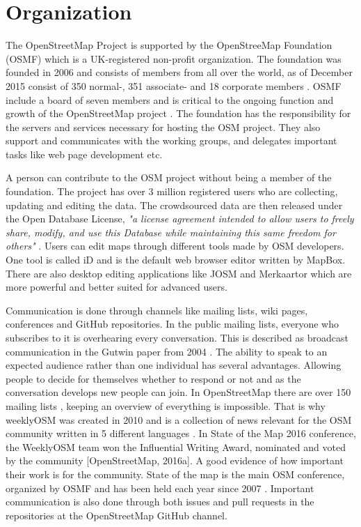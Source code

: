 \section{Organization}
The OpenStreetMap Project is supported by the OpenStreeMap Foundation (OSMF) which is a UK-registered non-profit organization. The foundation was founded in 2006 and consists of members from all over the world, as of December 2015 consist of 350 normal-, 351 associate- and 18 corporate members \cite{OSMF2015}. OSMF include a board of seven members and is critical to the ongoing function and growth of the OpenStreetMap project \cite{OSMF}.  The foundation has the responsibility for the servers and services necessary for hosting the OSM project. They also support and communicates with the working groups, and delegates important tasks like web page development etc. 

A person can contribute to the OSM project without being a member of the foundation. The project has over 3 million registered users \cite{OSMProject2016} who are collecting, updating and editing the data. The crowdsourced data are then released under the Open Database License, \textit{"a license agreement intended to allow users to freely share, modify, and use this Database while maintaining this same freedom for others"} \cite{ODbL}.  Users can edit maps through different tools made by OSM developers. One tool is called iD and is the default web browser editor written by MapBox. There are also desktop editing applications like JOSM and Merkaartor which are more powerful and better suited for advanced users. 

Communication is done through channels like mailing lists, wiki pages, conferences and GitHub repositories. In the public mailing lists, everyone who subscribes to it is overhearing every conversation. This is described as broadcast communication in the Gutwin paper from 2004 \cite{Gutwin2004}. The ability to speak to an expected audience rather than one individual has several advantages. Allowing people to decide for themselves whether to respond or not and as the conversation develops new people can join. In OpenStreetMap there are over 150 mailing lists \cite{Reiter2016}, keeping an overview of everything is impossible. That is why weeklyOSM was created in 2010 and is a collection of news relevant for the OSM community written in 5 different languages \cite{Freyfogle2016}.  In State of the Map 2016 conference, the WeeklyOSM team won the Influential Writing Award, nominated and voted by the community [OpenStreetMap, 2016a]. A good evidence of how important their work is for the community. State of the map is the main OSM conference, organized by OSMF and has been held each year since 2007 \cite{OpenStreetMapj}. Important communication is also done through both issues and pull requests in the repositories at the OpenStreetMap GitHub channel. 

